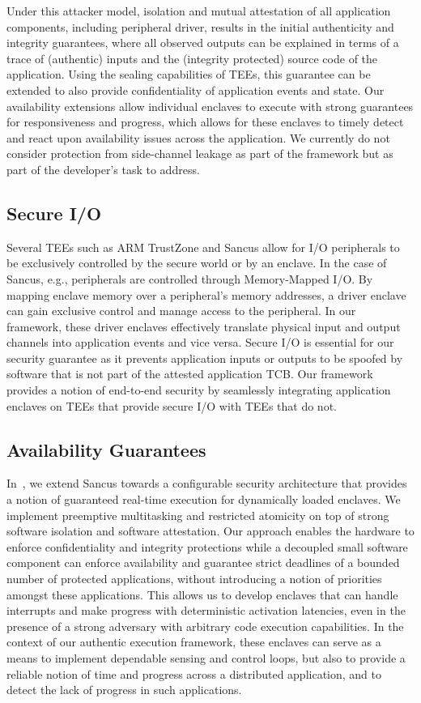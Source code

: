 \documentclass[sigconf]{acmart}
\begin{document}
Under this attacker model, isolation and mutual attestation of all
application components, including peripheral driver, results in the initial
authenticity and integrity guarantees, where all observed outputs can be
explained in terms of a trace of (authentic) inputs and the (integrity
protected) source code of the application. Using the sealing capabilities
of \acp{TEE}, this guarantee can be extended to also provide
confidentiality of application events and state.
Our availability extensions
allow individual enclaves to execute with strong guarantees for
responsiveness and progress, which allows for these enclaves to timely
detect and react upon availability issues across the application.
We currently do not
consider protection from side-channel leakage as part of the framework but
as part of the developer's task to address. 

\subsection{Secure I/O}

Several \acp{TEE} such as ARM TrustZone and Sancus allow for I/O
peripherals to be exclusively controlled by the secure world or by an
enclave. In the case of Sancus, e.g., peripherals are controlled through
Memory-Mapped I/O. By mapping enclave memory over a peripheral's  memory
addresses, a driver enclave can gain exclusive control and manage access to
the peripheral. In our framework, these driver enclaves effectively
translate physical input and output channels into application events and
vice versa.  Secure I/O is essential for our security guarantee as it
prevents application inputs or outputs to be spoofed by software that is
not part of the attested application \ac{TCB}. Our framework provides a
notion of end-to-end security by seamlessly integrating application
enclaves on \acp{TEE} that provide secure I/O with \acp{TEE} that do not.

\subsection{Availability Guarantees}

In~\cite{alder_2021_aion}, we extend Sancus towards a configurable security
architecture that provides a notion of guaranteed real-time execution for
dynamically loaded enclaves.  We implement preemptive multitasking and
restricted atomicity on top of strong software isolation and software
attestation. Our approach enables the hardware to enforce confidentiality
and integrity protections while a decoupled small software component can
enforce availability and guarantee strict deadlines of a bounded number of
protected applications, without introducing a notion of priorities amongst
these applications. This allows us to develop enclaves that can handle
interrupts and make progress with deterministic activation latencies, even
in the presence of a strong adversary with arbitrary code execution
capabilities. In the context of our authentic execution framework, these
enclaves can serve as a means to implement dependable sensing and control
loops, but also to provide a reliable notion of time and progress across a
distributed application, and to
detect the lack of progress in such applications.
\end{document}
